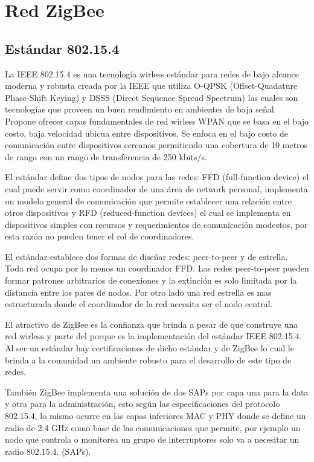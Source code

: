 \documentclass[10pt,journal,compsoc]{IEEEtran}
\begin{document}
\section{Red ZigBee}
\subsection{Estándar 802.15.4}
La IEEE 802.15.4 es una tecnología wirless  estándar para redes de bajo alcance moderna y robusta creada por la IEEE que utiliza O-QPSK (Offset-Quadature Phase-Shift Keying) y DSSS (Direct Sequence Spread Spectrum) las cuales son tecnologías que proveen un buen rendimiento en ambientes de baja señal. Propone ofrecer capas fundamentales de red wirless WPAN que se basa en el bajo costo, baja velocidad ubicua entre dispositivos. Se enfoca en el bajo costo de comunicación entre dispositivos cercanos permitiendo una cobertura de 10 metros de rango con un rango de transferencia de 250 kbits/s. 

El estándar define dos tipos de nodos para las redes: FFD (full-function device) el cual puede servir como coordinador de una área de network personal, implementa un modelo general de comunicación que permite establecer una relación entre otros dispositivos y RFD (reduced-function devices) el cual se implementa en dispositivos simples con recursos y requerimientos de comunicación modestos, por esta razón no pueden tener el rol de coordinadores. 

El estándar establece dos formas de diseñar redes: peer-to-peer y de estrella. Toda red ocupa por lo menos un coordinador FFD. Las redes peer-to-peer pueden formar patrones arbitrarios de conexiones y la extinción es solo limitada por la distancia entre los pares de nodos. Por otro lado una red estrella es mas estructurada donde el coordinador de la red necesita ser el nodo central.

El atractivo de ZigBee es la confianza que brinda a pesar de que construye una red wirless y parte del porque es la implementación del estándar IEEE 802.15.4. Al ser un estándar hay certificaciones de dicho estándar y de ZigBee lo cual le brinda a la comunidad un ambiente robusto para el desarrollo de este tipo de redes.

También ZigBee implementa una solución de dos SAPs por capa una para la data y otra para la administración, esto según las especificaciones del protocolo 802.15.4, lo mismo ocurre en las capas inferiores MAC y PHY donde se define un radio de 2.4 GHz como base de las comunicaciones que permite, por ejemplo un nodo que controla o monitorea un grupo de interruptores solo va a necesitar un radio 802.15.4. (SAPs).
\end{document}
